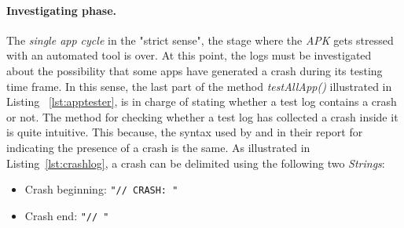 \paragraph{Investigating phase. }
The \textit{single app cycle} in the "strict sense", \ie the stage where the \textit{APK} gets stressed with an automated tool is over. At this point, the logs must be investigated about the possibility that some apps have generated a crash during its testing time frame. In this sense, the last part of the method \textit{testAllApp()} illustrated in Listing ~\ref{lst:apptester}, is in charge of stating whether a test log contains a crash or not. The method for checking whether a test log has collected a crash inside it is quite intuitive. This because, the syntax used by \monkey and \sapienz in their report for indicating the presence of a crash is the same. As illustrated in Listing~\ref{lst:crashlog}, a crash can be delimited using the following two \textit{Strings}: 
\begin{itemize}
\item Crash beginning: \texttt{"// CRASH: "}
\item Crash end: \texttt{"// "}
\end{itemize}

